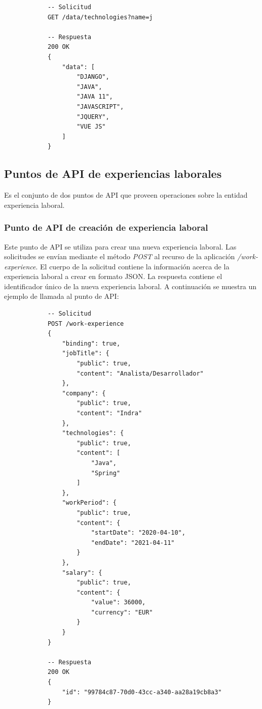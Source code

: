 \documentclass[a4paper, 12pt]{book}
\begin{document}
        {\scriptsize
    \linespread{1}
    \begin{verbatim}
			-- Solicitud
			GET /data/technologies?name=j

			-- Respuesta
			200 OK
			{
			    "data": [
			        "DJANGO",
			        "JAVA",
			        "JAVA 11",
			        "JAVASCRIPT",
			        "JQUERY",
			        "VUE JS"
			    ]
			}
    \end{verbatim}
    }

    \subsection{Puntos de API de experiencias laborales}
    \label{subsec:work_experience_endpoints}
    Es el conjunto de dos puntos de API que proveen operaciones sobre la entidad experiencia laboral.

    \subsubsection{Punto de API de creación de experiencia laboral}
    \label{subsec:post_work_experience}
    Este punto de API se utiliza para crear una nueva experiencia laboral.
    Las solicitudes se envían mediante el método \emph{POST} al recurso de la aplicación \emph{/work-experience}.
    El cuerpo de la solicitud contiene la información acerca de la experiencia laboral a crear en formato JSON.
    La respuesta contiene el identificador único de la nueva experiencia laboral.
    A continuación se muestra un ejemplo de llamada al punto de API:

        {\scriptsize
    \linespread{1}
    \begin{verbatim}
			-- Solicitud
			POST /work-experience
			{
			    "binding": true,
			    "jobTitle": {
			        "public": true,
			        "content": "Analista/Desarrollador"
			    },
			    "company": {
			        "public": true,
			        "content": "Indra"
			    },
			    "technologies": {
			        "public": true,
			        "content": [
			            "Java",
			            "Spring"
			        ]
			    },
			    "workPeriod": {
			        "public": true,
			        "content": {
			            "startDate": "2020-04-10",
			            "endDate": "2021-04-11"
			        }
			    },
			    "salary": {
			        "public": true,
			        "content": {
			            "value": 36000,
			            "currency": "EUR"
			        }
			    }
			}

			-- Respuesta
			200 OK
			{
			    "id": "99784c87-70d0-43cc-a340-aa28a19cb8a3"
			}
    \end{verbatim}
    }
\end{document}
